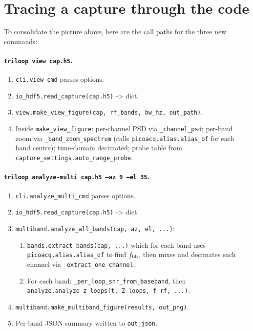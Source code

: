 \documentclass[11pt]{article}
\begin{document}
\section{Tracing a capture through the code}

To consolidate the picture above, here are the call paths for the
three new commands:

\paragraph{\texttt{triloop view cap.h5}.}
\begin{enumerate}\itemsep=2pt
\item \texttt{cli.view\_cmd} parses options.
\item \texttt{io\_hdf5.read\_capture(cap.h5)} -> dict.
\item \texttt{view.make\_view\_figure(cap, rf\_bands, bw\_hz, out\_path)}.
\item Inside \texttt{make\_view\_figure}: per-channel PSD via
      \texttt{\_channel\_psd}; per-band zoom via
      \texttt{\_band\_zoom\_spectrum} (calls
      \texttt{picoacq.alias.alias\_of} for each band centre);
      time-domain decimated; probe table from
      \texttt{capture\_settings.auto\_range\_probe}.
\end{enumerate}

\paragraph{\texttt{triloop analyze-multi cap.h5 --az 9 --el 35}.}
\begin{enumerate}\itemsep=2pt
\item \texttt{cli.analyze\_multi\_cmd} parses options.
\item \texttt{io\_hdf5.read\_capture(cap.h5)} -> dict.
\item \texttt{multiband.analyze\_all\_bands(cap, az, el, ...)}:
\begin{enumerate}\itemsep=1pt
\item \texttt{bands.extract\_bands(cap, ...)} which for each band uses
      \texttt{picoacq.alias.alias\_of} to find $f_{\rm bb}$, then mixes
      and decimates each channel via \texttt{\_extract\_one\_channel}.
\item For each band: \texttt{\_per\_loop\_snr\_from\_baseband}, then
      \texttt{analyze.analyze\_z\_loops(t, Z\_loops, f\_rf, ...)}.
\end{enumerate}
\item \texttt{multiband.make\_multiband\_figure(results, out\_png)}.
\item Per-band JSON summary written to \texttt{out\_json}.
\end{enumerate}
\end{document}
